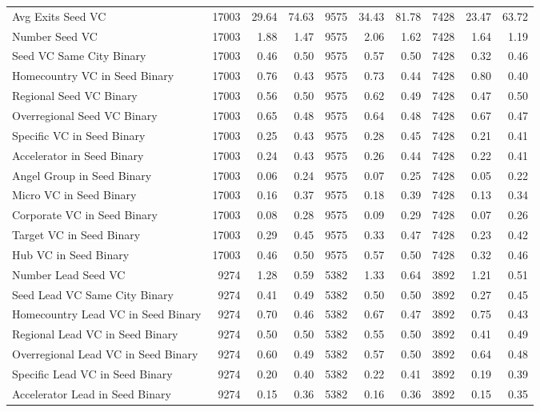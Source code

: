 {\begin{table}[!h]
{\begin{tabular}[t]{lrrrrrrrrr}
Avg Exits Seed VC & 17003 & 29.64 & 74.63 & 9575 & 34.43 & 81.78 & 7428 & 23.47 & 63.72\\
Number Seed VC & 17003 & 1.88 & 1.47 & 9575 & 2.06 & 1.62 & 7428 & 1.64 & 1.19\\
Seed VC Same City Binary & 17003 & 0.46 & 0.50 & 9575 & 0.57 & 0.50 & 7428 & 0.32 & 0.46\\
Homecountry VC in Seed Binary & 17003 & 0.76 & 0.43 & 9575 & 0.73 & 0.44 & 7428 & 0.80 & 0.40\\
\addlinespace
Regional Seed VC Binary & 17003 & 0.56 & 0.50 & 9575 & 0.62 & 0.49 & 7428 & 0.47 & 0.50\\
Overregional Seed VC Binary & 17003 & 0.65 & 0.48 & 9575 & 0.64 & 0.48 & 7428 & 0.67 & 0.47\\
Specific VC in Seed Binary & 17003 & 0.25 & 0.43 & 9575 & 0.28 & 0.45 & 7428 & 0.21 & 0.41\\
Accelerator in Seed Binary & 17003 & 0.24 & 0.43 & 9575 & 0.26 & 0.44 & 7428 & 0.22 & 0.41\\
Angel Group in Seed Binary & 17003 & 0.06 & 0.24 & 9575 & 0.07 & 0.25 & 7428 & 0.05 & 0.22\\
\addlinespace
Micro VC in Seed Binary & 17003 & 0.16 & 0.37 & 9575 & 0.18 & 0.39 & 7428 & 0.13 & 0.34\\
Corporate VC in Seed Binary & 17003 & 0.08 & 0.28 & 9575 & 0.09 & 0.29 & 7428 & 0.07 & 0.26\\
Target VC in Seed Binary & 17003 & 0.29 & 0.45 & 9575 & 0.33 & 0.47 & 7428 & 0.23 & 0.42\\
Hub VC in Seed Binary & 17003 & 0.46 & 0.50 & 9575 & 0.57 & 0.50 & 7428 & 0.32 & 0.46\\
Number Lead Seed VC & 9274 & 1.28 & 0.59 & 5382 & 1.33 & 0.64 & 3892 & 1.21 & 0.51\\
\addlinespace
Seed Lead VC Same City Binary & 9274 & 0.41 & 0.49 & 5382 & 0.50 & 0.50 & 3892 & 0.27 & 0.45\\
Homecountry Lead VC in Seed Binary & 9274 & 0.70 & 0.46 & 5382 & 0.67 & 0.47 & 3892 & 0.75 & 0.43\\
Regional Lead VC in Seed Binary & 9274 & 0.50 & 0.50 & 5382 & 0.55 & 0.50 & 3892 & 0.41 & 0.49\\
Overregional Lead VC in Seed Binary & 9274 & 0.60 & 0.49 & 5382 & 0.57 & 0.50 & 3892 & 0.64 & 0.48\\
Specific Lead VC in Seed Binary & 9274 & 0.20 & 0.40 & 5382 & 0.22 & 0.41 & 3892 & 0.19 & 0.39\\
\addlinespace
Accelerator Lead in Seed Binary & 9274 & 0.15 & 0.36 & 5382 & 0.16 & 0.36 & 3892 & 0.15 & 0.35\\

\end{tabular}}
\end{table}}
